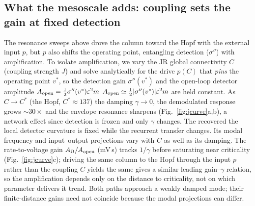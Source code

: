\documentclass[11pt,a4paper]{article}
\newcommand{\Sig}{\sigma}
\newcommand{\half}{\tfrac{1}{2}}
\providecommand{\DIFaddtex}[1]{{\protect\color{blue} \sf #1}} %
\providecommand{\DIFdeltex}[1]{{\protect\color{red} \scriptsize #1}} %
\providecommand{\DIFaddbegin}{} %
\providecommand{\DIFaddend}{} %
\providecommand{\DIFdelbegin}{} %
\providecommand{\DIFdelend}{} %
\providecommand{\DIFadd}[1]{\texorpdfstring{\DIFaddtex{#1}}{#1}} %
\providecommand{\DIFdel}[1]{\texorpdfstring{\DIFdeltex{#1}}{}} %
\begin{document}
\subsection{What the mesoscale adds: coupling sets the gain at fixed detection}\label{sec:jcurve}
The resonance sweeps above drove the column toward the Hopf with the external input
$p$, but $p$ also shifts the operating point, entangling detection ($\Sig''$) with
amplification. To isolate amplification, we vary the JR global connectivity $C$ (coupling
strength $J$) and solve analytically for the drive $p(C)$ that
\emph{pins} the operating point $v^*$, so the detection gain $\Sig''(v^*)$ and the
open-loop detector amplitude \DIFdelbegin \DIFdel{$A_{\rm open}=\half\Sig''(v^*)\varepsilon^2 m$ }\DIFdelend \DIFaddbegin \DIFadd{$A_{\rm open}\simeq\half|\Sig''(v^*)|\varepsilon^2 m$ }\DIFaddend are held
constant. As $C\!\to\!C^*$ (the Hopf, $C^*\!\approx\!137$) the damping
$\gamma\!\to\!0$, the demodulated response grows $\sim30\times$ and the envelope
resonance sharpens (Fig.~\ref{fig:jcurve}a,b), a network effect since
\DIFdelbegin \DIFdel{detection is frozen and only $\gamma$ changes. The recovered }\DIFdelend \DIFaddbegin \DIFadd{the local detector curvature is fixed while the recurrent transfer changes. Its modal frequency and
input--output projections vary with $C$ as well as its damping. The rate-to-voltage }\DIFaddend gain
$A_\Omega/A_{\rm open}$ \DIFaddbegin \DIFadd{(mV\,s) }\DIFaddend tracks $1/\gamma$ before saturating near criticality
(Fig.~\ref{fig:jcurve}c); driving the same column to the Hopf through the input $p$
rather than the coupling $C$ \DIFdelbegin \DIFdel{yields the same }\DIFdelend \DIFaddbegin \DIFadd{gives a similar leading }\DIFaddend gain--$\gamma$ \DIFdelbegin \DIFdel{relation, so the
amplification depends only on the distance to criticality, not
on which parameter
delivers it}\DIFdelend \DIFaddbegin \DIFadd{trend.
Both paths approach a weakly damped mode; their finite-distance gains need not
coincide because the modal projections can differ}\DIFaddend .
\end{document}
